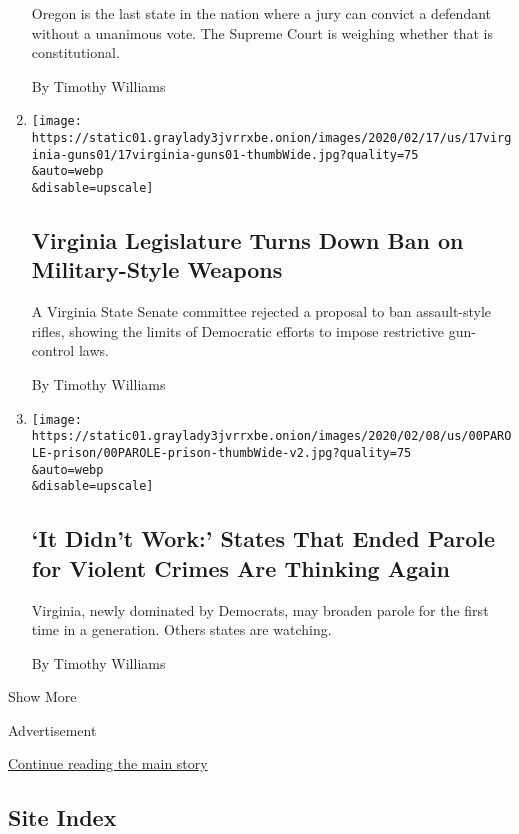 \begin{enumerate}
  Oregon is the last state in the nation where a jury can convict a
  defendant without a unanimous vote. The Supreme Court is weighing
  whether that is constitutional.

  By Timothy Williams
\item
  \href{/2020/02/17/us/Virginia-assault-weapons-legislature.html}{}

  \texttt{[image: https://static01.graylady3jvrrxbe.onion/images/2020/02/17/us/17virginia-guns01/17virginia-guns01-thumbWide.jpg?quality=75\\\&auto=webp\\\&disable=upscale]}

  \hypertarget{virginia-legislature-turns-down-ban-on-military-style-weapons}{%
  \subsection{Virginia Legislature Turns Down Ban on Military-Style
  Weapons}\label{virginia-legislature-turns-down-ban-on-military-style-weapons}}

  A Virginia State Senate committee rejected a proposal to ban
  assault-style rifles, showing the limits of Democratic efforts to
  impose restrictive gun-control laws.

  By Timothy Williams
\item
  \href{/2020/02/13/us/parole-virginia.html}{}

  \texttt{[image: https://static01.graylady3jvrrxbe.onion/images/2020/02/08/us/00PAROLE-prison/00PAROLE-prison-thumbWide-v2.jpg?quality=75\\\&auto=webp\\\&disable=upscale]}

  \hypertarget{it-didnt-work-states-that-ended-parole-for-violent-crimes-are-thinking-again}{%
  \subsection{`It Didn't Work:' States That Ended Parole for Violent
  Crimes Are Thinking
  Again}\label{it-didnt-work-states-that-ended-parole-for-violent-crimes-are-thinking-again}}

  Virginia, newly dominated by Democrats, may broaden parole for the
  first time in a generation. Others states are watching.

  By Timothy Williams
\end{enumerate}

Show More

Advertisement

\protect\hyperlink{after-mid2}{Continue reading the main story}

\hypertarget{site-index}{%
\subsection{Site Index}\label{site-index}}

